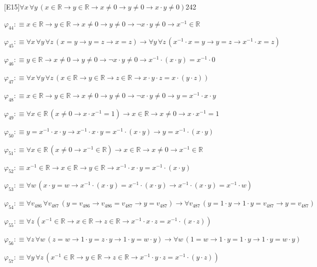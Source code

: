 \begin{fullproof}{[E15]}{$\forall x\,\forall y\,(x \in \mathbb{R} \to y \in \mathbb{R} \to x \neq 0 \to y \neq 0 \to x \cdot y \neq 0)$}{242}
\begin{abbrevlist}
\item $\varphi_{44} :\equiv x \in \mathbb{R} \to y \in \mathbb{R} \to x \neq 0 \to y \neq 0 \to \neg x \cdot y \neq 0 \to x^{-1} \in \mathbb{R}$
\item $\varphi_{45} :\equiv \forall x\,\forall y\,\forall z\,(x = y \to y = z \to x = z) \to \forall y\,\forall z\,(x^{-1} \cdot x = y \to y = z \to x^{-1} \cdot x = z)$
\item $\varphi_{46} :\equiv y \in \mathbb{R} \to x \neq 0 \to y \neq 0 \to \neg x \cdot y \neq 0 \to x^{-1} \cdot (x \cdot y) = x^{-1} \cdot 0$
\item $\varphi_{47} :\equiv \forall x\,\forall y\,\forall z\,(x \in \mathbb{R} \to y \in \mathbb{R} \to z \in \mathbb{R} \to x \cdot y \cdot z = x \cdot (y \cdot z))$
\item $\varphi_{48} :\equiv x \in \mathbb{R} \to y \in \mathbb{R} \to x \neq 0 \to y \neq 0 \to \neg x \cdot y \neq 0 \to y = x^{-1} \cdot x \cdot y$
\item $\varphi_{49} :\equiv \forall x \in \mathbb{R}\,(x \neq 0 \to x \cdot x^{-1} = 1) \to x \in \mathbb{R} \to x \neq 0 \to x \cdot x^{-1} = 1$
\item $\varphi_{50} :\equiv y = x^{-1} \cdot x \cdot y \to x^{-1} \cdot x \cdot y = x^{-1} \cdot (x \cdot y) \to y = x^{-1} \cdot (x \cdot y)$
\item $\varphi_{51} :\equiv \forall x \in \mathbb{R}\,(x \neq 0 \to x^{-1} \in \mathbb{R}) \to x \in \mathbb{R} \to x \neq 0 \to x^{-1} \in \mathbb{R}$
\item $\varphi_{52} :\equiv x^{-1} \in \mathbb{R} \to x \in \mathbb{R} \to y \in \mathbb{R} \to x^{-1} \cdot x \cdot y = x^{-1} \cdot (x \cdot y)$
\item $\varphi_{53} :\equiv \forall w\,(x \cdot y = w \to x^{-1} \cdot (x \cdot y) = x^{-1} \cdot (x \cdot y) \to x^{-1} \cdot (x \cdot y) = x^{-1} \cdot w)$
\item $\varphi_{54} :\equiv \forall v_{486}\,\forall v_{487}\,(y = v_{486} \to v_{486} = v_{487} \to y = v_{487}) \to \forall v_{487}\,(y = 1 \cdot y \to 1 \cdot y = v_{487} \to y = v_{487})$
\item $\varphi_{55} :\equiv \forall z\,(x^{-1} \in \mathbb{R} \to x \in \mathbb{R} \to z \in \mathbb{R} \to x^{-1} \cdot x \cdot z = x^{-1} \cdot (x \cdot z))$
\item $\varphi_{56} :\equiv \forall z\,\forall w\,(z = w \to 1 \cdot y = z \cdot y \to 1 \cdot y = w \cdot y) \to \forall w\,(1 = w \to 1 \cdot y = 1 \cdot y \to 1 \cdot y = w \cdot y)$
\item $\varphi_{57} :\equiv \forall y\,\forall z\,(x^{-1} \in \mathbb{R} \to y \in \mathbb{R} \to z \in \mathbb{R} \to x^{-1} \cdot y \cdot z = x^{-1} \cdot (y \cdot z))$

\end{abbrevlist}
\end{fullproof}
